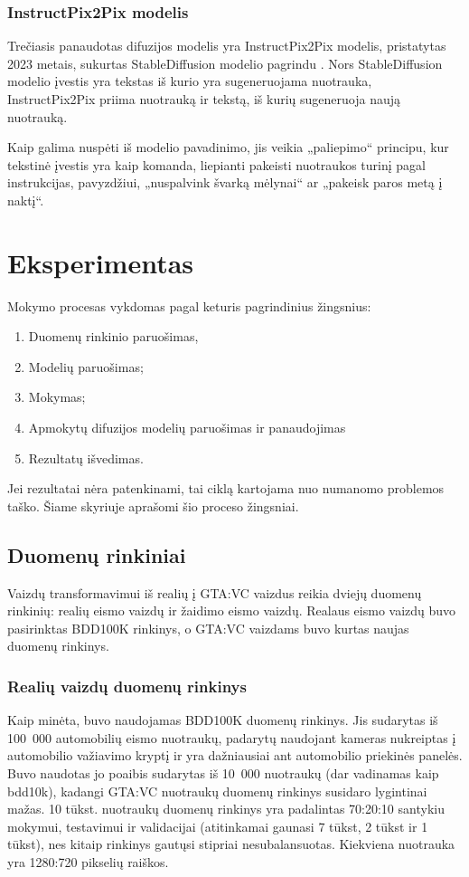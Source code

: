\documentclass{VUMIFPSbakalaurinis}
\begin{document}
        \subsubsection{InstructPix2Pix modelis}
            Trečiasis panaudotas difuzijos modelis yra InstructPix2Pix \cite{InstructPix2Pix} modelis, pristatytas 2023 metais, sukurtas StableDiffusion modelio pagrindu \cite{StableDiffusion}. Nors StableDiffusion modelio įvestis yra tekstas iš kurio yra sugeneruojama nuotrauka, InstructPix2Pix priima nuotrauką ir tekstą, iš kurių sugeneruoja naują nuotrauką.

            Kaip galima nuspėti iš modelio pavadinimo, jis veikia „paliepimo“ principu, kur tekstinė įvestis yra kaip komanda, liepianti pakeisti nuotraukos turinį pagal instrukcijas, pavyzdžiui, „nuspalvink švarką mėlynai“ ar „pakeisk paros metą į naktį“.
        
\section{Eksperimentas}
    Mokymo procesas vykdomas pagal keturis pagrindinius žingsnius: 
    \begin{enumerate}
        \item Duomenų rinkinio paruošimas,
        \item Modelių paruošimas;
        \item Mokymas;
        \item Apmokytų difuzijos modelių paruošimas ir panaudojimas
        \item Rezultatų išvedimas.
    \end{enumerate}
    Jei rezultatai nėra patenkinami, tai ciklą kartojama nuo numanomo problemos taško. Šiame skyriuje aprašomi šio proceso žingsniai.
    \subsection{Duomenų rinkiniai}
            Vaizdų transformavimui iš realių į GTA:VC vaizdus reikia dviejų duomenų rinkinių: realių eismo vaizdų ir žaidimo eismo vaizdų. Realaus eismo vaizdų buvo pasirinktas BDD100K \cite{BDD100K}  rinkinys, o GTA:VC vaizdams buvo kurtas naujas duomenų rinkinys. 
        \subsubsection{Realių vaizdų duomenų rinkinys}
            Kaip minėta, buvo naudojamas BDD100K duomenų rinkinys. Jis sudarytas iš 100~000 automobilių eismo nuotraukų, padarytų naudojant kameras nukreiptas į automobilio važiavimo kryptį ir yra dažniausiai ant automobilio priekinės panelės. Buvo naudotas jo poaibis sudarytas iš 10~000 nuotraukų (dar vadinamas kaip bdd10k), kadangi GTA:VC nuotraukų duomenų rinkinys susidaro lygintinai mažas. 10 tūkst. nuotraukų duomenų rinkinys yra padalintas 70:20:10 santykiu mokymui, testavimui ir validacijai (atitinkamai gaunasi 7 tūkst, 2 tūkst ir 1 tūkst), nes kitaip rinkinys gautųsi stipriai nesubalansuotas. Kiekviena nuotrauka yra 1280:720 pikselių raiškos.
            
\end{document}
